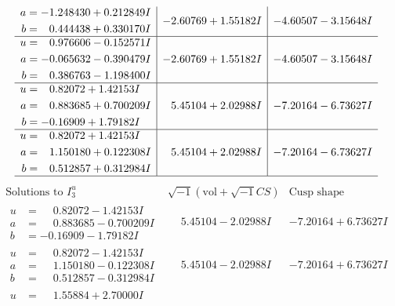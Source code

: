\documentclass[1p]{elsarticle_modified}
\theoremstyle{definition}
\newcommand{\I}{\sqrt{-1}}
\begin{document}
$$\begin{array}{c|c|c}
\begin{aligned}
a &= -1.248430 + 0.212849 I \\
b &= \phantom{-}0.444438 + 0.330170 I\end{aligned}
 & -2.60769 + 1.55182 I & -4.60507 - 3.15648 I \\ \hline\begin{aligned}
u &= \phantom{-}0.976606 - 0.152571 I \\
a &= -0.065632 - 0.390479 I \\
b &= \phantom{-}0.386763 - 1.198400 I\end{aligned}
 & -2.60769 + 1.55182 I & -4.60507 - 3.15648 I \\ \hline\begin{aligned}
u &= \phantom{-}0.82072 + 1.42153 I \\
a &= \phantom{-}0.883685 + 0.700209 I \\
b &= -0.16909 + 1.79182 I\end{aligned}
 & \phantom{-}5.45104 + 2.02988 I & -7.20164 - 6.73627 I \\ \hline\begin{aligned}
u &= \phantom{-}0.82072 + 1.42153 I \\
a &= \phantom{-}1.150180 + 0.122308 I \\
b &= \phantom{-}0.512857 + 0.312984 I\end{aligned}
 & \phantom{-}5.45104 + 2.02988 I & -7.20164 - 6.73627 I\\
 \hline 
 \end{array}$$\newpage$$\begin{array}{c|c|c}  
\text{Solutions to }I^u_{3}& \I (\text{vol} + \sqrt{-1}CS) & \text{Cusp shape}\\
 \hline 
\begin{aligned}
u &= \phantom{-}0.82072 - 1.42153 I \\
a &= \phantom{-}0.883685 - 0.700209 I \\
b &= -0.16909 - 1.79182 I\end{aligned}
 & \phantom{-}5.45104 - 2.02988 I & -7.20164 + 6.73627 I \\ \hline\begin{aligned}
u &= \phantom{-}0.82072 - 1.42153 I \\
a &= \phantom{-}1.150180 - 0.122308 I \\
b &= \phantom{-}0.512857 - 0.312984 I\end{aligned}
 & \phantom{-}5.45104 - 2.02988 I & -7.20164 + 6.73627 I \\ \hline\begin{aligned}
u &= \phantom{-}1.55884 + 2.70000 I \\

\end{aligned}
\end{array}$$
\end{document}
